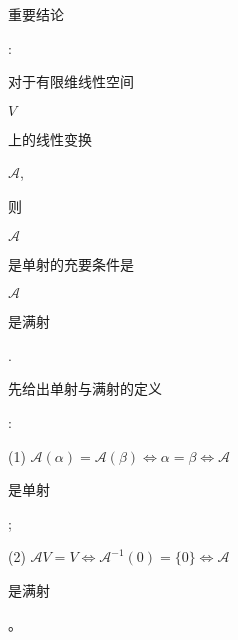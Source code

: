 \documentclass[10pt]{article}
\begin{document}
\begin{CJK}{UTF8}{mj}重要结论\end{CJK}: \begin{CJK}{UTF8}{mj}对于有限维线性空间\end{CJK} $V$ \begin{CJK}{UTF8}{mj}上的线性变换\end{CJK} $\mathscr{A}$, \begin{CJK}{UTF8}{mj}则\end{CJK} $\mathscr{A}$ \begin{CJK}{UTF8}{mj}是单射的充要条件是\end{CJK} $\mathscr{A}$ \begin{CJK}{UTF8}{mj}是满射\end{CJK}.

\begin{CJK}{UTF8}{mj}先给出单射与满射的定义\end{CJK}:

(1) $\mathscr{A}(\alpha)=\mathscr{A}(\beta) \Leftrightarrow \alpha=\beta \Leftrightarrow \mathscr{A}$ \begin{CJK}{UTF8}{mj}是单射\end{CJK};

(2) $\mathscr{A} V=V \Leftrightarrow \mathscr{A}^{-1}(0)=\{0\} \Leftrightarrow \mathscr{A}$ \begin{CJK}{UTF8}{mj}是满射\end{CJK}。
\end{document}
